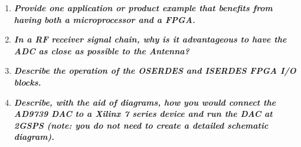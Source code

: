 \documentclass[11pt]{article}
\begin{document}
\begin{preview}
\begin{enumerate}
    \item \textit{\textbf{Provide one application or product example that benefits from having both a microprocessor and a FPGA.}}

    \item \textit{\textbf{In a RF receiver signal chain, why is it advantageous to have the ADC as close as possible to the Antenna?}}
    
    \item \textit{\textbf{Describe the operation of the OSERDES and ISERDES FPGA I/O blocks.}}
    
    \item \textit{\textbf{Describe, with the aid of diagrams, how you would connect the AD9739 DAC to a Xilinx 7 series device and run the DAC at 2GSPS (note: you do not need to create a detailed schematic diagram).}}
    

\end{enumerate}

\end{preview}
\end{document}
